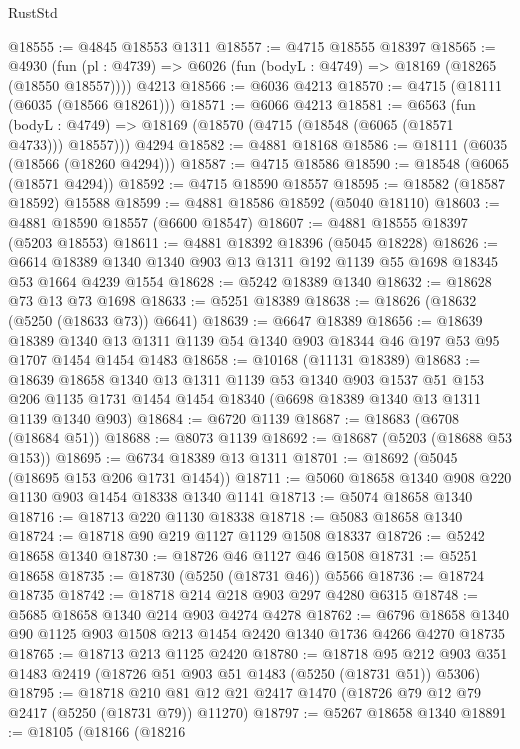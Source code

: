 \begin{lexlean}{RustStd}
\begin{coremodule}
@18555 := @4845 @18553 @1311
@18557 := @4715 @18555 @18397
@18565 := @4930
    (fun (pl : @4739) => @6026 (fun (bodyL : @4749) => @18169 (@18265 (@18550 @18557))))
    @4213
@18566 := @6036 @4213
@18570 := @4715 (@18111 (@6035 (@18566 @18261)))
@18571 := @6066 @4213
@18581 := @6563
    (fun (bodyL : @4749) => @18169 (@18570 (@4715 (@18548 (@6065 (@18571 @4733))) @18557)))
    @4294
@18582 := @4881 @18168
@18586 := @18111 (@6035 (@18566 (@18260 @4294)))
@18587 := @4715 @18586
@18590 := @18548 (@6065 (@18571 @4294))
@18592 := @4715 @18590 @18557
@18595 := @18582 (@18587 @18592) @15588
@18599 := @4881 @18586 @18592 (@5040 @18110)
@18603 := @4881 @18590 @18557 (@6600 @18547)
@18607 := @4881 @18555 @18397 (@5203 @18553)
@18611 := @4881 @18392 @18396 (@5045 @18228)
@18626 := @6614 @18389 @1340 @1340 @903 @13 @1311 @192 @1139 @55 @1698 @18345 @53 @1664 @4239 @1554
@18628 := @5242 @18389 @1340
@18632 := @18628 @73 @13 @73 @1698
@18633 := @5251 @18389
@18638 := @18626 (@18632 (@5250 (@18633 @73)) @6641)
@18639 := @6647 @18389
@18656 := @18639
    @18389
    @1340
    @13
    @1311
    @1139
    @54
    @1340
    @903
    @18344
    @46
    @197
    @53
    @95
    @1707
    @1454
    @1454
    @1483
@18658 := @10168 (@11131 @18389)
@18683 := @18639
    @18658
    @1340
    @13
    @1311
    @1139
    @53
    @1340
    @903
    @1537
    @51
    @153
    @206
    @1135
    @1731
    @1454
    @1454
    @18340
    (@6698 @18389 @1340 @13 @1311 @1139 @1340 @903)
@18684 := @6720 @1139
@18687 := @18683 (@6708 (@18684 @51))
@18688 := @8073 @1139
@18692 := @18687 (@5203 (@18688 @53 @153))
@18695 := @6734 @18389 @13 @1311
@18701 := @18692 (@5045 (@18695 @153 @206 @1731 @1454))
@18711 := @5060 @18658 @1340 @908 @220 @1130 @903 @1454 @18338 @1340 @1141
@18713 := @5074 @18658 @1340
@18716 := @18713 @220 @1130 @18338
@18718 := @5083 @18658 @1340
@18724 := @18718 @90 @219 @1127 @1129 @1508 @18337
@18726 := @5242 @18658 @1340
@18730 := @18726 @46 @1127 @46 @1508
@18731 := @5251 @18658
@18735 := @18730 (@5250 (@18731 @46)) @5566
@18736 := @18724 @18735
@18742 := @18718 @214 @218 @903 @297 @4280 @6315
@18748 := @5685 @18658 @1340 @214 @903 @4274 @4278
@18762 := @6796 @18658 @1340 @90 @1125 @903 @1508 @213 @1454 @2420 @1340 @1736 @4266 @4270 @18735
@18765 := @18713 @213 @1125 @2420
@18780 := @18718
    @95
    @212
    @903
    @351
    @1483
    @2419
    (@18726 @51 @903 @51 @1483 (@5250 (@18731 @51)) @5306)
@18795 := @18718 @210 @81 @12 @21 @2417 @1470 (@18726 @79 @12 @79 @2417 (@5250 (@18731 @79)) @11270)
@18797 := @5267 @18658 @1340
@18891 := @18105
    (@18166
      (@18216

\end{coremodule}
\end{lexlean}
